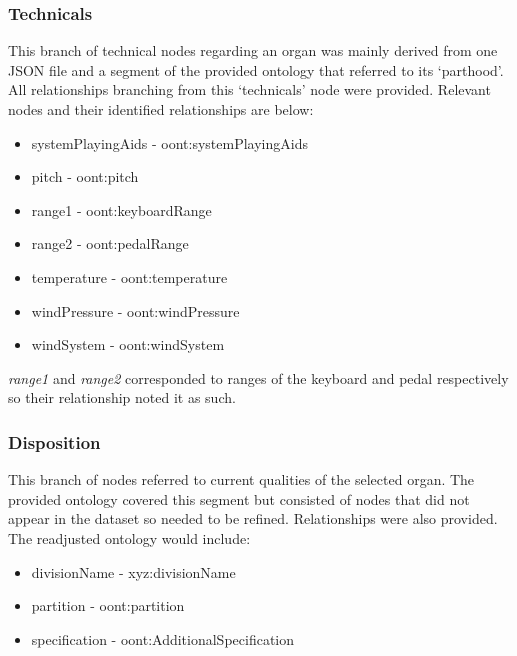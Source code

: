 \subsubsection{Technicals}
\hspace*{0.5cm} This branch of technical nodes regarding an organ was mainly derived from one JSON file and a segment of the provided ontology that referred to its `parthood'. All relationships branching from this `technicals' node were provided. Relevant nodes and their identified relationships are below:

\vspace{-0.1cm}
\begin{itemize}
    \itemsep0em 
    \item systemPlayingAids - oont:systemPlayingAids
    \vspace{-0.05cm}
    \item pitch - oont:pitch
    \vspace{-0.05cm}
    \item range1 -  oont:keyboardRange
    \vspace{-0.05cm}
    \item range2 - oont:pedalRange
    \vspace{-0.05cm}
    \item temperature - oont:temperature
    \vspace{-0.05cm}
    \item windPressure - oont:windPressure
    \vspace{-0.05cm}
    \item windSystem - oont:windSystem
\end{itemize}

\textit{range1} and \textit{range2} corresponded to ranges of the keyboard and pedal respectively so their relationship noted it as such. 

\subsubsection{Disposition}
\hspace*{0.5cm} This branch of nodes referred to current qualities of the selected organ. The provided ontology covered this segment but consisted of nodes that did not appear in the dataset so needed to be refined. Relationships were also provided. The readjusted ontology would include:

\vspace{-0.1cm}
\begin{itemize}
    \itemsep0em 
    \item divisionName - xyz:divisionName
    \vspace{-0.05cm}
    \item partition - oont:partition
    \vspace{-0.05cm}
    \item specification - oont:AdditionalSpecification
\end{itemize}

